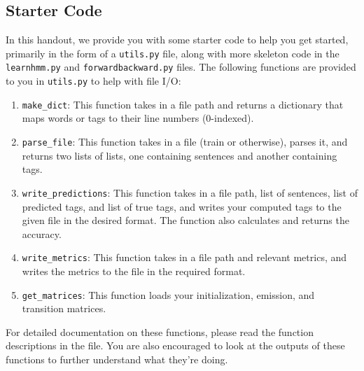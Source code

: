 \documentclass[11pt,addpoints,answers]{exam}
\begin{document}
\subsection{Starter Code}

In this handout, we provide you with some starter code to help you get started, primarily in the form of a \texttt{utils.py} file, along with more skeleton code in the \texttt{learnhmm.py} and \texttt{forwardbackward.py} files. The following functions are provided to you in \texttt{utils.py} to help with file I/O:

\begin{enumerate}
    \item \texttt{make\_dict}: This function takes in a file path and returns a dictionary that maps words or tags to their line numbers (0-indexed).
    
    \item \texttt{parse\_file}: This function takes in a file (train or otherwise), parses it, and returns two lists of lists, one containing sentences and another containing tags.
    
    \item \texttt{write\_predictions}: This function takes in a file path, list of sentences, list of predicted tags, and list of true tags, and writes your computed tags to the given file in the desired format. The function also calculates and returns the accuracy.
    
    \item \texttt{write\_metrics}: This function takes in a file path and relevant metrics, and writes the metrics to the file in the required format.
    
    \item \texttt{get\_matrices}: This function loads your initialization, emission, and transition matrices.
    
\end{enumerate}

For detailed documentation on these functions, please read the function descriptions in the file. You are also encouraged to look at the outputs of these functions to further understand what they're doing.
\end{document}

